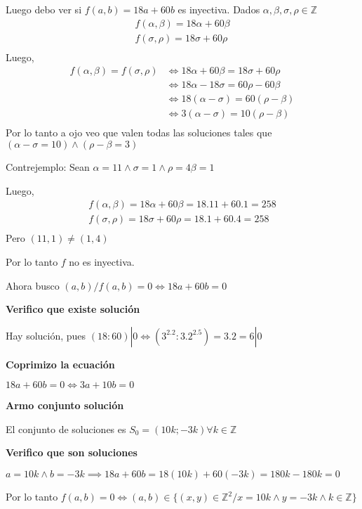 Luego debo ver si $ f(a,b) = 18a+ 60b $ es inyectiva.
Dados $ \alpha, \beta, \sigma, \rho \in \mathbb{Z} $
\begin{align*}
    f(\alpha, \beta) = 18\alpha + 60\beta \\
    f(\sigma, \rho) = 18\sigma + 60\rho \\
\end{align*}
Luego,
\begin{align*}
    f(\alpha, \beta) = f(\sigma, \rho) &\iff 18\alpha + 60\beta = 18\sigma + 60\rho \\
    &\iff 18\alpha - 18\sigma = 60\rho - 60\beta \\
    &\iff 18(\alpha - \sigma) = 60(\rho - \beta) \\
    &\iff 3(\alpha - \sigma) = 10(\rho - \beta) \\
\end{align*}
Por lo tanto a ojo veo que valen todas las soluciones tales que $ (\alpha - \sigma = 10) \wedge (\rho - \beta = 3) $

Contrejemplo: Sean $ \alpha = 11 \wedge \sigma = 1 \wedge \rho = 4 \beta = 1 $

Luego,
\begin{align*}
    f(\alpha, \beta) = 18\alpha + 60\beta = 18.11 + 60.1 = 258 \\
    f(\sigma, \rho) = 18\sigma + 60\rho = 18.1 + 60.4 = 258 \\
\end{align*}
Pero $ (11,1) \neq (1,4) $

Por lo tanto $ f $ no es inyectiva.

Ahora busco $ (a,b)/ f(a,b) = 0 \iff 18a+60b = 0 $

\textbf{Verifico que existe solución}

Hay solución, pues $(18:60)|0 \iff (3^2.2:3.2^2.5) = 3.2 = 6|0 $

\textbf{Coprimizo la ecuación}

$ 18a+60b = 0 \iff 3a+10b = 0 $

\textbf{Armo conjunto solución}

El conjunto de soluciones es $ S_0 = (10k; -3k) \forall k \in \mathbb{Z} $

\textbf{Verifico que son soluciones}

$ a = 10k \wedge b = -3k \implies 18a + 60b = 18(10k) + 60(-3k) = 180k - 180k = 0 $

Por lo tanto $ f(a,b) = 0 \iff (a,b) \in \{ (x,y) \in \mathbb{Z}^2 / x = 10k \wedge y = -3k \wedge k \in \mathbb{Z} \} $

